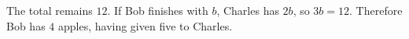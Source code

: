 The total remains $12$. If Bob finishes with $b$, Charles has $2b$, so $3b=12$. Therefore Bob has $\boxed 4$ apples, having given five to Charles.
